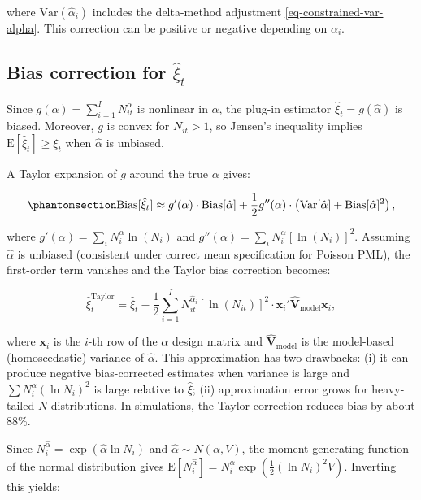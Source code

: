 where $\text{Var}(\hat{\alpha}_i)$ includes the delta-method
adjustment \eqref{eq-constrained-var-alpha}. This correction can be
positive or negative depending on $\alpha_i$.

\subsection{\texorpdfstring{Bias correction for
$\hat{\xi}_{t}$}{Bias correction for \textbackslash hat\{\textbackslash xi\}\_\{t\}}}\label{bias-correction-for-hatxi_t}

Since $g(\alpha) = \sum_{i=1}^I N_{it}^\alpha$ is nonlinear in
$\alpha$, the plug-in estimator $\hat{\xi}_t = g(\hat{\alpha})$ is
biased. Moreover, $g$ is convex for $N_{it} > 1$, so Jensen's
inequality implies $\text{E}[\hat{\xi}_t] \geq \xi_t$ when
$\hat{\alpha}$ is unbiased.

A Taylor expansion of $g$ around the true $\alpha$ gives:

\begin{equation}\protect\phantomsection\label{eq-bias-approx}{
\text{Bias}[\hat\xi_t] \approx g'(\alpha) \cdot \text{Bias}[\hat\alpha] + \frac{1}{2} g''(\alpha) \cdot \left(\text{Var}[\hat\alpha] + \text{Bias}[\hat\alpha]^2\right),
}\end{equation}

where $g'(\alpha) = \sum_i N_i^\alpha \ln(N_i)$ and
$g''(\alpha) = \sum_i N_i^\alpha [\ln(N_i)]^2$. Assuming
$\hat\alpha$ is unbiased (consistent under correct mean specification
for Poisson PML), the first-order term vanishes and the Taylor bias
correction becomes:

\[
\hat\xi_t^{\text{Taylor}} = \hat\xi_t - \frac{1}{2} \sum_{i=1}^I N_{it}^{\hat\alpha_i} [\ln(N_{it})]^2 \cdot \mathbf{x}_i' \hat{\mathbf{V}}_{\text{model}} \mathbf{x}_i,
\]

where $\mathbf{x}_i$ is the $i$-th row of the $\alpha$ design
matrix and $\hat{\mathbf{V}}_{\text{model}}$ is the model-based
(homoscedastic) variance of $\hat\alpha$. This approximation has two
drawbacks: (i) it can produce negative bias-corrected estimates when
variance is large and $\sum N_i^{\alpha} (\ln N_i)^2$ is large
relative to $\hat{\xi}$; (ii) approximation error grows for
heavy-tailed $N$ distributions. In simulations, the Taylor correction
reduces bias by about 88\%.

Since
$N_i^{\hat{\alpha}} = \exp(\hat{\alpha} \ln N_i)$ and
$\hat{\alpha} \sim N(\alpha, V)$, the moment generating function of
the normal distribution gives
$\text{E}[N_i^{\hat{\alpha}}] = N_i^{\alpha} \exp(\frac{1}{2} (\ln N_i)^2 V)$.
Inverting this yields:

